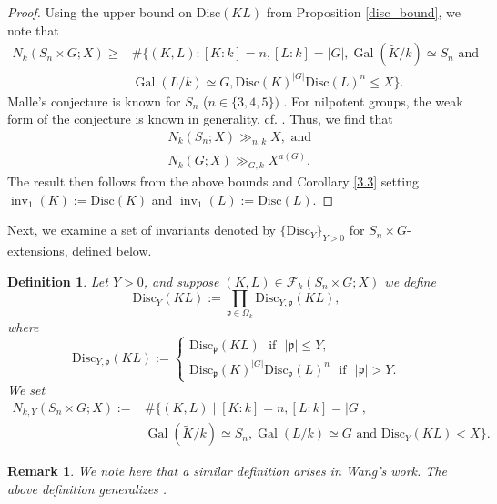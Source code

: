 \documentclass[11pt]{amsart}
\newtheorem{definition}[theorem]{Definition}
\newtheorem{remark}[theorem]{Remark}
\newcommand{\fp}{\mathfrak{p}}
\newcommand{\disc}{\mathrm{Disc}}
\newcommand{\op}[1]{\operatorname{#1}}
\numberwithin{equation}{section}
\begin{document}
\begin{proof}
Using the upper bound on $\disc(KL)$ from Proposition \ref{disc_bound}, we note that
\begin{align*}
      N_k(S_n\times G; X) \geq & \#\{(K,L) : [K:k]= n, [L:k] = |G|, \op{Gal}(\widetilde{K}/k) \simeq S_n \text{ and }\\
      & \op{Gal}(L/k) \simeq G, \disc(K)^{|G|}\disc(L)^n \leq X\}.
\end{align*}    
Malle's conjecture is known for $S_n$ ($n\in \{3,4,5\})$ \cite{davenport1971density, bhargava2005density, bhargava2010density}. For nilpotent groups, the weak form of the conjecture is known in generality, cf. \cite{klunersmalle}. Thus, we find that
\[\begin{split}
    & N_k(S_n; X)\gg_{n, k} X, \text{ and } \\
    & N_k(G; X) \gg_{G, k} X^{a(G)}.
\end{split}\]
The result then follows from the above bounds and Corollary \ref{3.3} setting $\op{inv}_1(K):=\disc(K)$ and $\op{inv}_1(L):=\disc(L)$.
\end{proof}
\par Next, we examine a set of invariants denoted by $\{\disc_Y\}_{Y>0}$ for $S_n\times G$-extensions, defined below. \begin{definition}\label{def_Y}
    Let $Y > 0$, and suppose $(K,L) \in \mathcal{F}_{k}(S_n\times G; X)$ we define 
    \[
    \disc_{Y}(KL) := \prod_{\fp \in \Omega_k}\disc_{Y, \fp}(KL),
    \]
 where
    \[
\disc_{Y, \fp}(KL) :=
\begin{cases}
    \disc_{\fp}(KL)\text{ }\mathrm{ if }\text{ }|\fp| \leq Y,\\
    \disc_{\fp}(K)^{|G|}\disc_{\fp}(L)^n \text{ } \mathrm{ if } \text{ }|\fp| > Y.
\end{cases}
\]
We set 
\begin{equation}\label{N k y defn}
    \begin{split}N_{k, Y}(S_n\times G; X):= & \# \{(K,L)\mid[K:k]=n, [L:k]=|G|,\\
& \op{Gal}(\widetilde{K}/k)\simeq S_n, \op{Gal}(L/k)\simeq G\text{ and }\disc_Y(KL) < X\}.\end{split}
\end{equation}
\end{definition}
\begin{remark}
    We note here that a similar definition arises in Wang's work. The above definition generalizes \cite[equation (5.4)]{Wang2020}.
\end{remark}
\end{document}
